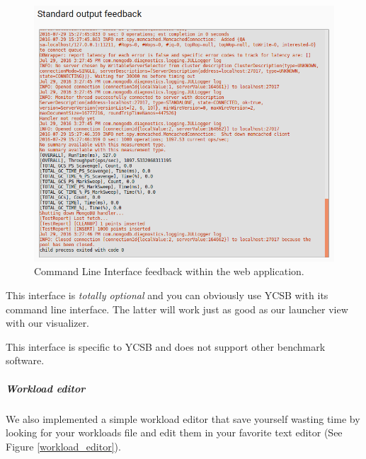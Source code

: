 \documentclass[a4paper,11pt]{report}
\begin{document}
\begin{figure}[ht]
\begin{center}
\includegraphics[width=1\linewidth]{images/cli_feedback.png}
\caption{Command Line Interface feedback within the web application.}
\label{cli_feedback}
\end{center}
\end{figure}

\bigskip

This interface is \textit{totally optional} and you can obviously use YCSB with its command line interface. The latter will work just as good as our launcher view with our visualizer.

This interface is specific to YCSB and does not support other benchmark software.

\subparagraph{Workload editor}

We also implemented a simple workload editor that save yourself wasting time by looking for your workloads file and edit them in your favorite text editor (See Figure \ref{workload_editor}).
\end{document}
